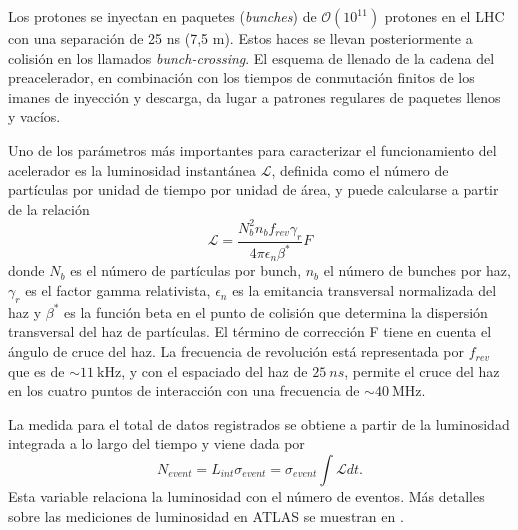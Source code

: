 Los protones se inyectan en paquetes (\textit{bunches}) de \(\mathcal{O}(10^{11})\) protones en el \ac{LHC} con una separación de 25 ns (7,5 m). Estos haces se llevan posteriormente a colisión en los llamados \textit{bunch-crossing}. El esquema de llenado de la cadena del preacelerador, en combinación con los tiempos de conmutación finitos de los imanes de inyección y descarga, da lugar a patrones regulares de paquetes llenos y vacíos.




Uno de los parámetros más importantes para caracterizar el funcionamiento del acelerador es la luminosidad instantánea \(\mathcal{L}\), definida como el número de partículas por unidad de tiempo por unidad de \'area, y puede calcularse a partir de la relación
\begin{equation}
    \mathcal{L} = \frac{N_b^ 2n_b f_{rev}\gamma_r}{4\pi\epsilon_n\beta^*}F
    \label{eq:atlas:LHC:instantaneous_lumi}
\end{equation}
donde $N_b$ es el número de partículas por bunch, $n_b$ el número de bunches por haz, $\gamma_r$ es el factor gamma relativista, $\epsilon_n$ es la emitancia transversal normalizada del haz y $\beta^*$ es la función beta en el punto de colisión que determina la dispersión transversal del haz de partículas. El término de corrección F tiene en cuenta el ángulo de cruce del haz. La frecuencia de revolución está representada por $f_{rev}$ que es de \(\sim 11~\)kHz, y con el espaciado del haz de \(25~ns\), permite el cruce del haz en los cuatro puntos de interacción con una frecuencia de \(\sim 40~\)MHz.

La medida para el total de datos registrados se obtiene a partir de la luminosidad integrada a lo largo del tiempo y viene dada por
\begin{equation}
    N_{event} = L_{int} \sigma_{event} = \sigma_{event} \int \mathcal{L} dt.
    \label{eq:atlas:LHC:integrated_lumi}
\end{equation}
Esta variable relaciona la luminosidad con el número de eventos. Más detalles sobre las mediciones de luminosidad en \ac{ATLAS} se muestran en \Sect{\ref{sec:atlas:runs}}.








